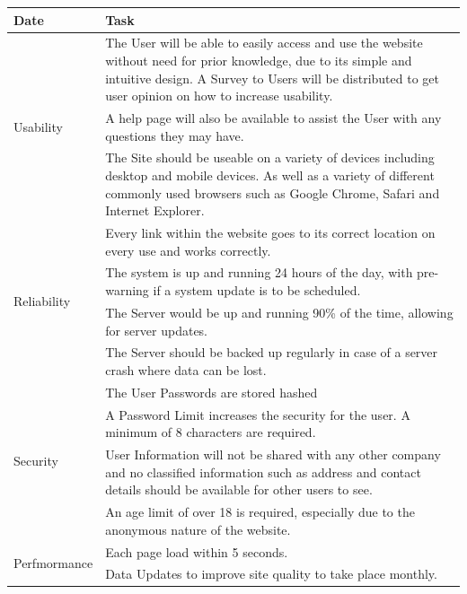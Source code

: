 \documentclass[12pt]{article}
\begin{document}
\begin{table}[ht!]
    \centering
    \begin{tabular}{|p{2.5cm}|p{12cm}|}
        \hline
        Date & Task\\
        \hline
        \multirow{3}{2.5cm}{Usability} & The User will be able to easily access
        and use the website without need for prior knowledge, due to its simple
        and intuitive design. A Survey to Users will be distributed to get user
        opinion on how to increase usability.\\
        \cline{2-2}
        & A help page will also be available to assist the User with any questions they may have. \\
        \cline{2-2}
        & The Site should be useable on a variety of devices including desktop
        and mobile devices. As well as a variety of different commonly used
        browsers such as Google Chrome, Safari and Internet Explorer.\\
        \hline
        \multirow{4}{2.5cm}{Reliability} & Every link within the website goes to
        its correct location on every use and works correctly.\\
        \cline{2-2}
        & The system is up and running 24 hours of the day, with pre-warning if
        a system update is to be scheduled.\\
        \cline{2-2}
        & The Server would be up and running 90\% of the time, allowing for
        server updates.\\
        \cline{2-2}
        & The Server should be backed up regularly in case of a server crash
        where data can be lost.\\
        \hline
        \multirow{4}{2.5cm}{Security} & The User Passwords are stored hashed\\
        & A Password Limit increases the security for the user. A minimum of 8
        characters are required.\\
        \cline{2-2}
        & User Information will not be shared with any other company and no
        classified information such as address and contact details should be
        available for other users to see.\\
        \cline{2-2}
        & An age limit of over 18 is required, especially due to the anonymous
        nature of the website.\\
        \hline
        \multirow{2}{2.5cm}{Perfmormance} & Each page load within 5 seconds.\\
        & Data Updates to improve site quality to take place monthly.\\

\end{tabular}
\end{table}
\end{document}
